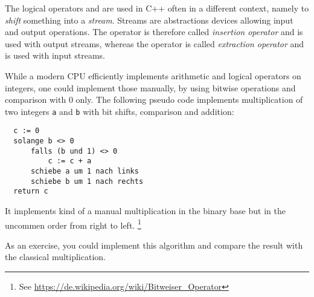 \begin{rem}
  The logical operators \cpp{<<} and \cpp{>>} are used in C++ often in a different context, namely to \emph{shift} something into a \emph{stream}.
  Streams are abstractions devices allowing input and output operations. The operator \cpp{<<} is therefore called \emph{insertion operator} and
  is used with output streams, whereas the operator \cpp{>>} is called \emph{extraction operator} and is used with input streams.
\end{rem}

\begin{example}
  While a modern CPU efficiently implements arithmetic and logical operators on integers, one could implement those manually, by using bitwise
  operations and comparison with 0 only. The following pseudo code implements multiplication of two integers \texttt{a} and \texttt{b} with
  bit shifts, comparison and addition:
  \begin{verbatim}
  c := 0
  solange b <> 0
      falls (b und 1) <> 0
          c := c + a
      schiebe a um 1 nach links
      schiebe b um 1 nach rechts
  return c
  \end{verbatim}
  It implements kind of a manual multiplication in the binary base but in the uncommen order from right to left.
  \footnote{See \url{https://de.wikipedia.org/wiki/Bitweiser_Operator}}

  As an exercise, you could implement this algorithm and compare the result with the classical multiplication.
\end{example}


